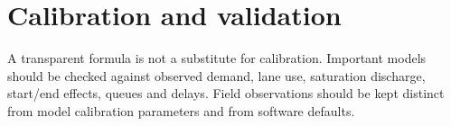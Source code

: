 \section{Calibration and validation}
A transparent formula is not a substitute for calibration.  Important models should be
checked against observed demand, lane use, saturation discharge, start/end effects,
queues and delays.  Field observations should be kept distinct from model calibration
parameters and from software defaults.
